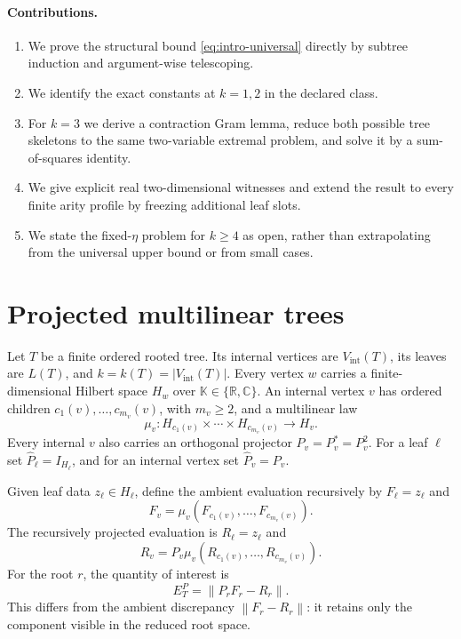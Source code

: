 \documentclass[11pt]{article}
\theoremstyle{definition}
\newcommand{\R}{\mathbb{R}}
\newcommand{\C}{\mathbb{C}}
\newcommand{\K}{\mathbb{K}}
\newcommand{\norm}[1]{\left\lVert #1\right\rVert}
\begin{document}
\paragraph{Contributions.}
\begin{enumerate}
\item We prove the structural bound \eqref{eq:intro-universal} directly by
subtree induction and argument-wise telescoping.
\item We identify the exact constants at $k=1,2$ in the declared class.
\item For $k=3$ we derive a contraction Gram lemma, reduce both possible tree
skeletons to the same two-variable extremal problem, and solve it by a
sum-of-squares identity.
\item We give explicit real two-dimensional witnesses and extend the result to
every finite arity profile by freezing additional leaf slots.
\item We state the fixed-$\eta$ problem for $k\ge4$ as open, rather than
extrapolating from the universal upper bound or from small cases.
\end{enumerate}

\section{Projected multilinear trees}

Let $T$ be a finite ordered rooted tree.  Its internal vertices are
$V_{\mathrm{int}}(T)$, its leaves are $L(T)$, and
$k=k(T)=|V_{\mathrm{int}}(T)|$.  Every vertex $w$ carries a finite-dimensional
Hilbert space $H_w$ over $\K\in\{\R,\C\}$.  An internal vertex $v$ has ordered
children $c_1(v),\ldots,c_{m_v}(v)$, with $m_v\ge2$, and a multilinear law
\[
 \mu_v:H_{c_1(v)}\times\cdots\times H_{c_{m_v}(v)}\longrightarrow H_v.
\]
Every internal $v$ also carries an orthogonal projector
$P_v=P_v^*=P_v^2$.  For a leaf $\ell$ set $\widehat P_\ell=I_{H_\ell}$, and
for an internal vertex set $\widehat P_v=P_v$.

Given leaf data $z_\ell\in H_\ell$, define the ambient evaluation recursively
by $F_\ell=z_\ell$ and
\[
 F_v=\mu_v(F_{c_1(v)},\ldots,F_{c_{m_v}(v)}).
\]
The recursively projected evaluation is $R_\ell=z_\ell$ and
\[
 R_v=P_v\mu_v(R_{c_1(v)},\ldots,R_{c_{m_v}(v)}).
\]
For the root $r$, the quantity of interest is
\begin{equation}\label{eq:projected-error}
 E_T^P=\norm{P_rF_r-R_r}.
\end{equation}
This differs from the ambient discrepancy $\norm{F_r-R_r}$: it retains only
the component visible in the reduced root space.
\end{document}
